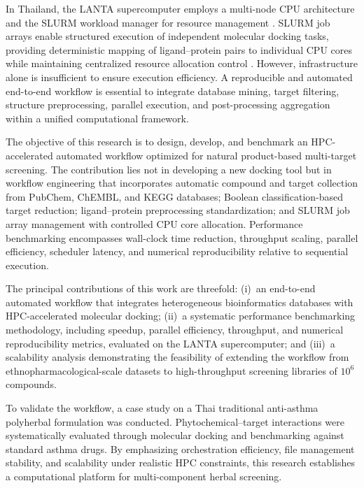 \documentclass[11pt,a4paper]{article}
\begin{document}
In Thailand, the LANTA supercomputer employs a multi-node CPU architecture and the SLURM workload manager for resource management \cite{varavithya2023}. SLURM job arrays enable structured execution of independent molecular docking tasks, providing deterministic mapping of ligand--protein pairs to individual CPU cores while maintaining centralized resource allocation control \cite{goponenko2024}. However, infrastructure alone is insufficient to ensure execution efficiency. A reproducible and automated end-to-end workflow is essential to integrate database mining, target filtering, structure preprocessing, parallel execution, and post-processing aggregation within a unified computational framework.

The objective of this research is to design, develop, and benchmark an HPC-accelerated automated workflow optimized for natural product-based multi-target screening. The contribution lies not in developing a new docking tool but in workflow engineering that incorporates automatic compound and target collection from PubChem, ChEMBL, and KEGG databases; Boolean classification-based target reduction; ligand--protein preprocessing standardization; and SLURM job array management with controlled CPU core allocation. Performance benchmarking encompasses wall-clock time reduction, throughput scaling, parallel efficiency, scheduler latency, and numerical reproducibility relative to sequential execution.

The principal contributions of this work are threefold: (i)~an end-to-end automated workflow that integrates heterogeneous bioinformatics databases with HPC-accelerated molecular docking; (ii)~a systematic performance benchmarking methodology, including speedup, parallel efficiency, throughput, and numerical reproducibility metrics, evaluated on the LANTA supercomputer; and (iii)~a scalability analysis demonstrating the feasibility of extending the workflow from ethnopharmacological-scale datasets to high-throughput screening libraries of $10^6$ compounds.

To validate the workflow, a case study on a Thai traditional anti-asthma polyherbal formulation was conducted. Phytochemical--target interactions were systematically evaluated through molecular docking and benchmarking against standard asthma drugs. By emphasizing orchestration efficiency, file management stability, and scalability under realistic HPC constraints, this research establishes a computational platform for multi-component herbal screening.


\end{document}

